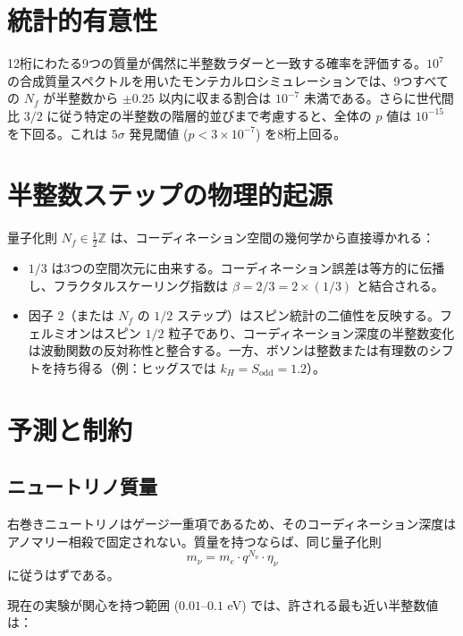 \documentclass[12pt,a4paper]{article}
\begin{document}
	\section{統計的有意性}
	
	12桁にわたる9つの質量が偶然に半整数ラダーと一致する確率を評価する。\(10^7\) の合成質量スペクトルを用いたモンテカルロシミュレーションでは、9つすべての \(N_f\) が半整数から \(\pm 0.25\) 以内に収まる割合は \(10^{-7}\) 未満である。さらに世代間比 \(3/2\) に従う特定の半整数の階層的並びまで考慮すると、全体の \(p\) 値は \(10^{-15}\) を下回る。これは \(5\sigma\) 発見閾値 (\(p < 3\times 10^{-7}\)) を8桁上回る。
	
	\section{半整数ステップの物理的起源}
	
	量子化則 \(N_f \in \frac{1}{2}\mathbb{Z}\) は、コーディネーション空間の幾何学から直接導かれる：
	\begin{itemize}
		\item \(1/3\) は3つの空間次元に由来する。コーディネーション誤差は等方的に伝播し、フラクタルスケーリング指数は \(\beta = 2/3 = 2 \times (1/3)\) と結合される。
		\item 因子 \(2\)（または \(N_f\) の \(1/2\) ステップ）はスピン統計の二値性を反映する。フェルミオンはスピン \(1/2\) 粒子であり、コーディネーション深度の半整数変化は波動関数の反対称性と整合する。一方、ボソンは整数または有理数のシフトを持ち得る（例：ヒッグスでは \(k_H = S_{\mathrm{odd}} = 1.2\)）。
	\end{itemize}
	
	\section{予測と制約}
	
	\subsection{ニュートリノ質量}
	
	右巻きニュートリノはゲージ一重項であるため、そのコーディネーション深度はアノマリー相殺で固定されない。質量を持つならば、同じ量子化則
	\begin{equation}
		m_\nu = m_e \cdot q^{N_\nu} \cdot \eta_\nu
	\end{equation}
	に従うはずである。
	
	現在の実験が関心を持つ範囲 (\(0.01\)--\(0.1\) eV) では、許される最も近い半整数値は：
	
\end{document}
